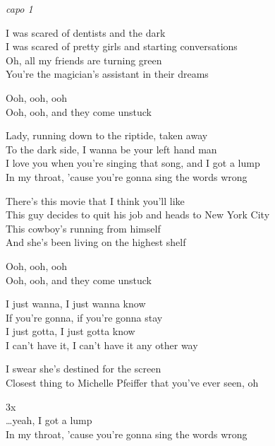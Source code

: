 
\re{}\textit{capo 1}

\ve{}
I was scared of dentists and the dark\\
I was scared of pretty girls and starting conversations\\
Oh, all my friends are turning green\\
You're the magician's assistant in their dreams

\re{}
Ooh, ooh, ooh\\
Ooh, ooh, and they come unstuck

\cho{}
Lady, running down to the riptide, taken away\\
To the dark side, I wanna be your left hand man\\
I love you when you're singing that song, and I got a lump\\
In my throat, 'cause you're gonna sing the words wrong

\ve{}
There's this movie that I think you'll like\\
This guy decides to quit his job and heads to New York City\\
This cowboy's running from himself\\
And she's been living on the highest shelf

\re{}
Ooh, ooh, ooh\\
Ooh, ooh, and they come unstuck

\cho{}

\ve{}
I just wanna, I just wanna know\\
If you're gonna, if you're gonna stay\\
I just gotta, I just gotta know\\
I can't have it, I can't have it any other way

\re{}
I swear she's destined for the screen\\
Closest thing to Michelle Pfeiffer that you've ever seen, oh

\cho{} 3x \\
\ldots{}yeah, I got a lump\\
In my throat, 'cause you're gonna sing the words wrong

\esong{}
